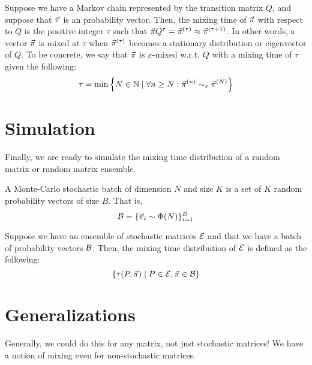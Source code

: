\begin{definition}
Suppose we have a Markov chain represented by the transition matrix $Q$, and suppose that $\vec{\pi}$ is an probability vector.
Then, the mixing time of $\vec{\pi}$ with respect to $Q$ is the positive integer $\tau$ such that $\vec{\pi} Q^\tau = \vec{\pi}^{(\tau)} \approx \vec{\pi}^{(\tau + 1)}$.
In other words, a vector $\vec{\pi}$ is mixed at $\tau$ when $\vec{\pi}^{(\tau)}$ becomes a stationary distribution or eigenvector of $Q$.
To be concrete, we say that $\vec{\pi}$ is $\varepsilon$-mixed w.r.t. $Q$ with a mixing time of $\tau$ given the following:
$$\tau = \min\left\{ N \in \mathbb{N} \mid \forall n \geq N : \vec{\pi}^{(n)} \sim_{\varepsilon} \vec{\pi}^{(N)} \right\} $$
\end{definition}




\section{Simulation}

Finally, we are ready to simulate the mixing time distribution of a random matrix or random matrix ensemble.

\begin{definition}
A Monte-Carlo stochastic batch of dimension $N$ and size $K$ is a set of $K$ random probability vectors of size $B$. That is,
$$\mathcal{B} = \{\vec{\pi}_i \sim \Phi(N) \}_{i = 1}^{B}$$
\end{definition}



\begin{definition}
Suppose we have an ensemble of stochastic matrices $\mathcal{E}$ and that we have a batch of probability vectors $\mathcal{B}$.
Then, the mixing time distribution of $\mathcal{E}$ is defined as the following:
$$\{\tau(P, \vec{\pi}) \mid P \in \mathcal{E}, \vec{\pi} \in \mathcal{B} \}$$
\end{definition}


\section{Generalizations}

Generally, we could do this for any matrix, not just stochastic matrices! We have a notion of mixing even for non-stochastic matrices.

